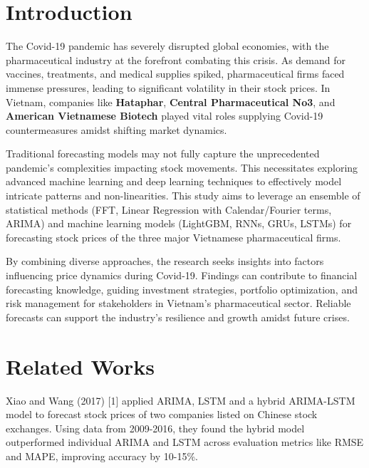 \documentclass{ieeeojies}
\begin{document}
\titlepgskip=-15pt

\maketitle

\section{Introduction}
\label{sec:introduction}
The Covid-19 pandemic has severely disrupted global economies, with the pharmaceutical industry at the forefront combating this crisis. As demand for vaccines, treatments, and medical supplies spiked, pharmaceutical firms faced immense pressures, leading to significant volatility in their stock prices. In Vietnam, companies like \textbf{Hataphar}, \textbf{Central Pharmaceutical No3}, and \textbf{American Vietnamese Biotech} played vital roles supplying Covid-19 countermeasures amidst shifting market dynamics. 

Traditional forecasting models may not fully capture the unprecedented pandemic's complexities impacting stock movements. This necessitates exploring advanced machine learning and deep learning techniques to effectively model intricate patterns and non-linearities. This study aims to leverage an ensemble of statistical methods (FFT, Linear Regression with Calendar/Fourier terms, ARIMA) and machine learning models (LightGBM, RNNs, GRUs, LSTMs) for forecasting stock prices of the three major Vietnamese pharmaceutical firms.

By combining diverse approaches, the research seeks insights into factors influencing price dynamics during Covid-19. Findings can contribute to financial forecasting knowledge, guiding investment strategies, portfolio optimization, and risk management for stakeholders in Vietnam's pharmaceutical sector. Reliable forecasts can support the industry's resilience and growth amidst future crises.

 

\section{Related Works}

Xiao and Wang (2017) [1] applied ARIMA, LSTM and a hybrid ARIMA-LSTM model to forecast stock prices of two companies listed on Chinese stock exchanges. Using data from 2009-2016, they found the hybrid model outperformed individual ARIMA and LSTM across evaluation metrics like RMSE and MAPE, improving accuracy by 10-15\%.
\end{document}
